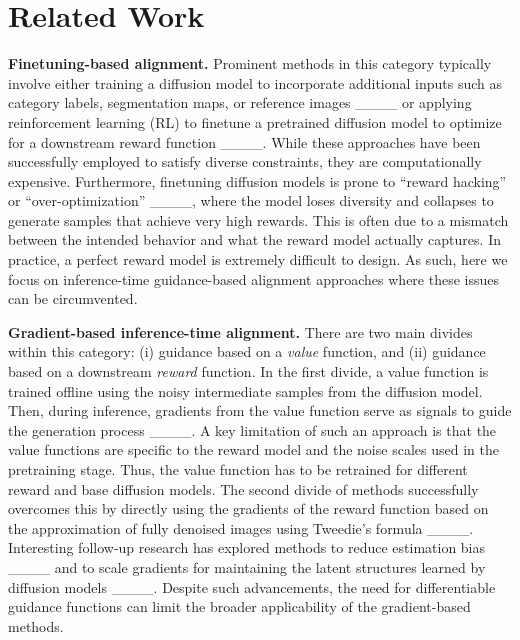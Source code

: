 \section{Related Work}
\vspace{-0.2cm}
\label{sec:lit}


\textbf{Finetuning-based alignment.} Prominent methods in this category typically involve either training a diffusion model to incorporate additional inputs such as category labels, segmentation maps, or reference images ____ or applying reinforcement learning (RL) to finetune a pretrained diffusion model to optimize for a downstream reward function ____. While these approaches have been successfully employed to satisfy diverse constraints, they are computationally expensive. Furthermore, finetuning diffusion models is prone to ``reward hacking'' or ``over-optimization'' ____, where the model loses diversity and collapses to generate samples that achieve very high rewards. This is often due to a mismatch between the intended behavior and what the reward model actually captures. In practice, a perfect reward model is extremely difficult to design. As such, here we focus on inference-time guidance-based alignment approaches where these issues can be circumvented.  

\textbf{Gradient-based inference-time alignment.} 
There are two main divides within this category: (i) guidance based on a \emph{value} function, and (ii) guidance based on a downstream \emph{reward} function. In the first divide, a value function is trained offline using the noisy intermediate samples from the diffusion model. Then, during inference, gradients from the value function serve as signals to guide the generation process ____. A key limitation of such an approach is that the value functions are specific to the reward model and the noise scales used in the pretraining stage. Thus, the value function has to be retrained for different reward and base diffusion models. The second divide of methods successfully overcomes this by directly using the gradients of the reward function based on the approximation of fully denoised images using Tweedie's formula ____. Interesting follow-up research has explored methods to reduce estimation bias ____ and to scale gradients for maintaining the latent structures learned by diffusion models ____. Despite such advancements, the need for differentiable guidance functions can limit the broader applicability of the gradient-based methods.

